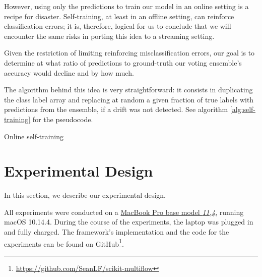 \documentclass[runningheads]{llncs}
\begin{document}
However, using only the predictions to train our model in an online setting is a recipe for disaster. Self-training, at least in an offline setting, can reinforce classification errors; it is, therefore, logical for us to conclude that we will encounter the same risks in porting this idea to a streaming setting.

Given the restriction of limiting reinforcing misclassification errors, our goal is to determine at what ratio of predictions to ground-truth our voting ensemble's accuracy would decline and by how much.

The algorithm behind this idea is very straightforward: it consists in duplicating the class label array and replacing at random a given fraction of true labels with predictions from the ensemble, if a drift was not detected. See algorithm \ref{alg:self-training} for the pseudocode.

\begin{algorithm}

\caption{\label{alg:self-training}Online self-training}
\end{algorithm}

\section{Experimental Design\label{section:experimental_design}}
In this section, we describe our experimental design.

All experiments were conducted on a \href{https://everymac.com/systems/apple/macbook_pro/specs/macbook-pro-core-i7-2.2-15-iris-only-mid-2015-retina-display-specs.html}{MacBook Pro base model \textit{11,4}}, running macOS 10.14.4. During the course of the experiments, the laptop was plugged in and fully charged. The framework's implementation and the code for the experiments can be found on GitHub\footnote{\url{https://github.com/SeanLF/scikit-multiflow}}.
\end{document}
